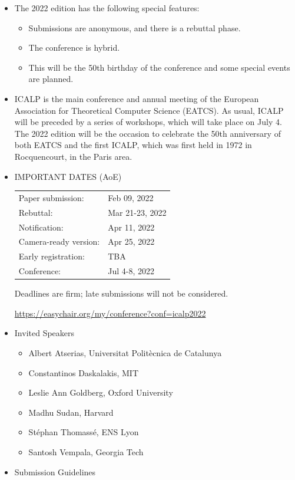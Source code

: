 \documentclass[prodmode,acmtecs]{acmsmall} %
\begin{document}
\begin{itemize}\item  The 2022 edition has the following special features: 
 
\begin{itemize}\item  Submissions are anonymous, and there is a rebuttal phase.
\item  The conference is hybrid.
\item  This will be the 50th birthday of the conference and some special events are planned.
\end{itemize} 
\item  ICALP is the main conference and annual meeting of the European Association for Theoretical Computer Science (EATCS). As usual, ICALP will be preceded by a series of workshops, which will take place on July 4. The 2022 edition will be the occasion to celebrate the 50th anniversary of both EATCS and the first ICALP, which was first held in 1972 in Rocquencourt, in the Paris area. 
 
\item  IMPORTANT DATES  (AoE) 
 
\begin{tabulary}{\linewidth}{LL}Paper submission:  & Feb 09, 2022 \\
Rebuttal:  & Mar 21-23, 2022 \\
Notification:  & Apr 11, 2022 \\
Camera-ready version:  & Apr 25, 2022 \\
Early registration:  & TBA \\
Conference:  & Jul 4-8, 2022 \\
\end{tabulary}
 
  Deadlines are firm; late submissions will not be considered. 
 
  \href{https://easychair.org/my/conference?conf=icalp2022}{https://easychair.org/my/conference?conf=icalp2022} 
 
\item  Invited Speakers  
 
\begin{itemize}\item  Albert Atserias, Universitat Politècnica de Catalunya
\item  Constantinos Daskalakis, MIT
\item  Leslie Ann Goldberg, Oxford University
\item  Madhu Sudan, Harvard
\item  Stéphan Thomassé, ENS Lyon
\item  Santosh Vempala, Georgia Tech
\end{itemize} 
\item  Submission Guidelines  
 

\end{itemize}
\end{document}
